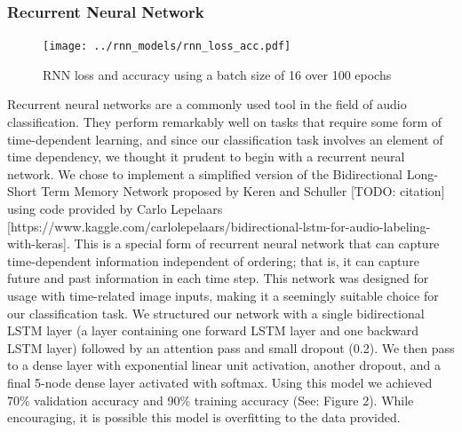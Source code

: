 \documentclass[11pt]{article}
\begin{document}
\subsubsection{Recurrent Neural Network}
\begin{figure}[!htb]
\begin{center}
   \texttt{[image: ../rnn\_models/rnn\_loss\_acc.pdf]}
   \caption{RNN loss and accuracy using a batch size of 16 over 100 epochs}
\end{center}
\end{figure}
Recurrent neural networks are a commonly used tool in the field of audio classification. 
They perform remarkably well on tasks that require some form of time-dependent learning, and since our classification task involves an element of time dependency, we thought it prudent to begin with a recurrent neural network.
We chose to implement a simplified version of the Bidirectional Long-Short Term Memory Network proposed by Keren and Schuller [TODO: citation] using code provided by Carlo Lepelaars [https://www.kaggle.com/carlolepelaars/bidirectional-lstm-for-audio-labeling-with-keras]. This is a special form of recurrent neural network that can capture time-dependent information independent of ordering; that is, it can capture future and past information in each time step.
This network was designed for usage with time-related image inputs, making it a seemingly suitable choice for our classification task. 
We structured our network with a single bidirectional LSTM layer (a layer containing one forward LSTM layer and one backward LSTM layer) followed by an attention pass and small dropout (0.2). We then pass to a dense layer with exponential linear unit activation, another dropout, and a final 5-node dense layer activated with softmax.
Using this model we achieved 70\% validation accuracy and 90\% training accuracy (See: Figure 2). 
While encouraging, it is possible this model is overfitting to the data provided.
\end{document}
